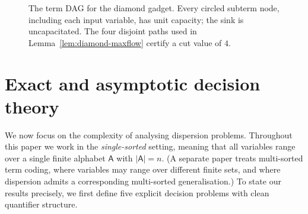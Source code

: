 \documentclass[11pt]{article}
\theoremstyle{definition}
\theoremstyle{plain}
\newcommand{\A}{\mathsf{A}}
\begin{document}
\begin{figure}[t]
\centering
{}
\caption{The term DAG for the diamond gadget.  Every circled subterm node, including each input variable,
has unit capacity; the sink is uncapacitated.  The four disjoint paths used in
Lemma~\ref{lem:diamond-maxflow} certify a cut value of $4$.}
\label{fig:diamond-termgraph}
\end{figure}

\section{Exact and asymptotic decision theory}
\label{sec:complexity-dichotomy}

We now focus on the complexity of analysing dispersion problems.
Throughout this paper we work in the \emph{single-sorted} setting, meaning that all variables range over a single finite alphabet $\A$ with $|\A|=n$.
(A separate paper treats multi-sorted term coding, where variables may range over different finite sets, and where dispersion admits a corresponding multi-sorted generalisation.)
To state our results precisely, we first define five explicit decision problems with clean quantifier structure.
\end{document}
